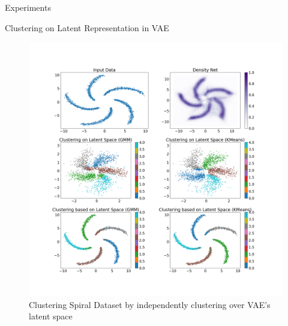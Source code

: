 \documentclass{article}
\begin{document}
\begin{psection}{Experiments}
\begin{psubsection}{Clustering on Latent Representation in VAE}
		\begin{figure}[H]
			\captionsetup{justification=centering,margin=0.8cm}
			\centering
			\includegraphics[trim={0 6cm 0 6cm},clip,scale=0.25]{includes/vae-clustering.png}
			\caption*{Clustering Spiral Dataset by independently clustering over VAE's latent space}
		\end{figure}

	\end{psubsection}

\clearpage




\end{psection}
\end{document}
